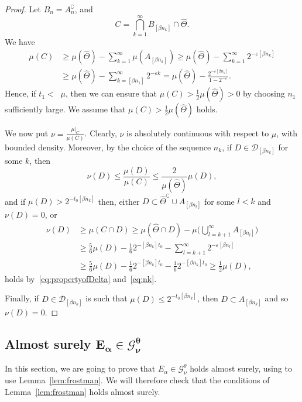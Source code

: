 \documentclass[11pt]{article}
\theoremstyle{definition}
\numberwithin{equation}{section}
\numberwithin{figure}{section}
\numberwithin{table}{section}
\DeclareMathOperator{\udimh}{\overline{dim}_H}
\begin{document}
\begin{proof}
Let $B_n = A_n^\complement$, and
\[
C = \bigcap_{k=1}^\infty B_{[\beta n_k]} \cap \hat{\Theta}.
\]
We have
\begin{align*}
\mu (C) &\geq \mu (\hat{\Theta}) - \sum_{k=1}^\infty \mu (A_{[\beta n_k]}) \geq \mu (\hat{\Theta}) - \sum_{k=1}^\infty 2^{-
\varepsilon [\beta n_k]} \\ &\geq \mu (\hat{\Theta}) -
\sum_{k=[\beta n_1]}^\infty 2^{-\varepsilon k} = \mu (\hat{\Theta}) - \frac{2^{-\varepsilon [\beta n_1]}}{1 - 2^{-\varepsilon}}.
\end{align*}
Hence, if $t_1 < \udimh \mu$, then we can ensure that $\mu (C) >
\frac{1}{2} \mu (\hat{\Theta}) > 0$ by choosing $n_1$ sufficiently large. We assume that $\mu (C) > \frac{1}{2} \mu (\hat{\Theta})$ holds.

We now put $\nu = \frac{\mu|_C}{\mu (C)}$. Clearly, $\nu$ is absolutely continuous with respect to $\mu$, with bounded density. Moreover, by the choice of the sequence $n_k$, if $D \in
\mathscr{D}_{[\beta n_k]}$ for some $k$, then
\[
\nu (D) \leq \frac{\mu (D)}{\mu (C)} \leq \frac{2}{\mu(\hat{\Theta})}
\mu (D),
\]
and if $\mu (D) > 2^{- t_0 [\beta n_k]}$ then, either $D \subset
\hat{\Theta}^\complement \cup A_{[\beta n_l]}$ for some $l < k$ and $\nu (D) = 0$, or
\begin{align*}
\nu (D) &\geq \mu (C \cap D) \geq \mu (\hat{\Theta} \cap D) - \mu
\biggl(\bigcup_{l = k+1}^\infty A_{[\beta n_l]} \biggr) \\ &\geq
\frac{5}{6} \mu (D) - \frac{1}{6} 2^{-[\beta n_k]t_0} -
\sum_{l=k+1}^\infty 2^{-\varepsilon [\beta n_l]} \\ &\geq
\frac{5}{6} \mu (D) - \frac{1}{6} 2^{-[\beta n_k]t_0} -
\frac{1}{6} 2^{-[\beta n_k] t_0} \geq \frac{1}{2} \mu (D),
\end{align*}
holds by~\eqref{eq:propertyofDelta} and~\eqref{eq:nk}.

Finally, if $D \in \mathscr{D}_{[\beta n_k]}$ is such that $\mu (D)
\leq 2^{- t_0 [\beta n_k]}$, then $D \subset A_{[\beta n_k]}$ and so $\nu (D) = 0$.
\end{proof}

\subsection{Almost surely \texorpdfstring{$\boldsymbol{E_\alpha \in \mathscr{G}_\nu^\theta}$}{}}

In this section, we are going to prove that $E_\alpha \in
\mathscr{G}_\nu^\theta$ holds almost surely, using to use Lemma~\ref{lem:frostman}. We will therefore check that the conditions of Lemma~\ref{lem:frostman} holds almost surely.
\end{document}
